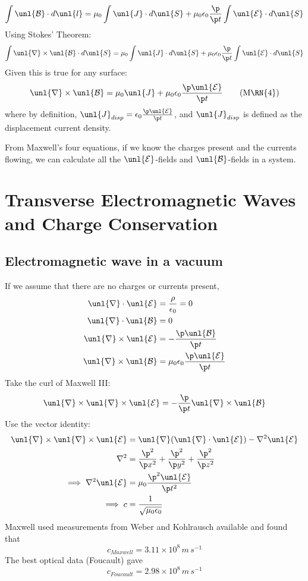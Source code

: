 \documentclass[a4paper, 11pt, normalem]{report}
\renewcommand\E{\mathcal{E}}
\newcommand\uE{\unl{\E}}
\renewcommand\B{\mathcal{B}}
\newcommand\uB{\unl{\B}}
\renewcommand\del{\unl{\nabla}}
\newcommand\eno{\epsilon_0}
\newcommand\J{\unl{J}}
\begin{document}
\begin{equation}
    \int \uB \cdot d\unl{l} = \mu_0 \int \J \cdot d\unl{S} + \mu_0\eno\frac{\p}{\p t} \int \uE \cdot d\unl{S}
\end{equation}
Using Stokes' Theorem:
\begin{equation}
    \int \del \times \uB \cdot d\unl{S} = \mu_0 \int \J \cdot d\unl{S} + \mu_0\eno\frac{\p}{\p t} \int \uE\cdot d\unl{S}
\end{equation}
Given this is true for any surface:
\begin{equation}
    \del \times \uB = \mu_0\J + \mu_0\eno\frac{\p \uE}{\p t} \tag{M\RN{4}}
\end{equation}
where by definition, $\J_{disp} = \eno\frac{\p\uE}{\p t}$, and $\J_{disp}$ is defined as the displacement current density.

From Maxwell's four equations, if we know the charges present and the currents flowing, we can calculate all the $\uE$-fields and $\uB$-fields in a system.

\section{Transverse Electromagnetic Waves and Charge Conservation}
\subsection{Electromagnetic wave in a vacuum}
If we assume that there are no charges or currents present,
\begin{align}
    \del \cdot \uE &= \frac{\rho}{\eno} = 0 \\
    \del \cdot \uB &= 0 \\
    \del \times \uE &= -\frac{\p \uB}{\p t} \\
    \del \times \uB &= \mu_0\eno\frac{\p\uE}{\p t}
\end{align}
Take the curl of Maxwell \RN{3}:
\begin{equation}
    \del \times \del \times \uE = -\frac{\p}{\p t} \del \times \uB
\end{equation}
Use the vector identity:
\begin{align}
    \del \times \del \times \uE &= \del(\del\cdot\uE) - \nabla^2\uE \\
    \nabla^2 &= \frac{\p^2}{\p x^2} + \frac{\p^2}{\p y^2} + \frac{\p^2}{\p z^2} \\
    \implies \nabla^2\uE &= \mu_0 \frac{\p^2 \uE}{\p t^2} \\
    \implies c &= \frac{1}{\sqrt{\mu_0\eno}}
\end{align}
Maxwell used measurements from Weber and Kohlrausch available and found that
\begin{equation}
    c_{Maxwell} = 3.11\times10^8 \,m\,s^{-1}
\end{equation}
The best optical data (Foucault) gave
\begin{equation}
    c_{Foucault} = 2.98\times10^8\,m\,s^{-1}
\end{equation}
\end{document}

